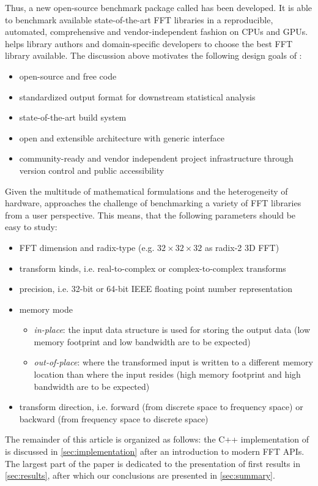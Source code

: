 Thus, a new open-source benchmark package called \gearshifft{} \citep{gearshifft_github} has been developed. It is able to benchmark available state-of-the-art FFT libraries in a reproducible, automated, comprehensive and vendor-independent fashion on CPUs and GPUs.
\gearshifft{} helps library authors and domain-specific developers to choose the best FFT library available. The discussion above motivates the following design goals of \gearshifft{}:
%
\begin{itemize}
\item open-source and free code
\item standardized output format for downstream statistical analysis
\item state-of-the-art build system
\item open and extensible architecture with generic interface
\item community-ready and vendor independent project infrastructure through version control and public accessibility
\end{itemize}
%
Given the multitude of mathematical formulations and the heterogeneity of hardware, \gearshifft{} approaches the challenge of benchmarking a variety of FFT libraries from a user perspective. This means, that the following parameters should be easy to study:
%
\begin{itemize}
\item FFT dimension and radix-type (e.g. $32{\times}32{\times}32$ as radix-2 3D FFT)
\item transform kinds, i.e. real-to-complex or complex-to-complex transforms
\item precision, i.e. 32-bit or 64-bit IEEE floating point number representation
\item memory mode
  \begin{itemize}
  \item \emph{in-place}: the input data structure is used for storing the output data (low memory footprint and low bandwidth are to be expected)
  \item \emph{out-of-place}:  where the transformed input is written to a different memory location than where the input resides (high memory footprint and high bandwidth are to be expected)
  \end{itemize}
\item transform direction, i.e. forward (from discrete space to frequency space) or backward (from frequency space to discrete space)
\end{itemize}
%
The remainder of this article is organized as follows: the C++ implementation of \gearshifft{} is discussed in \cref{sec:implementation} after an introduction to modern FFT APIs. The largest part of the paper is dedicated to the presentation of first results in \cref{sec:results}, after which our conclusions are presented in \cref{sec:summary}.

